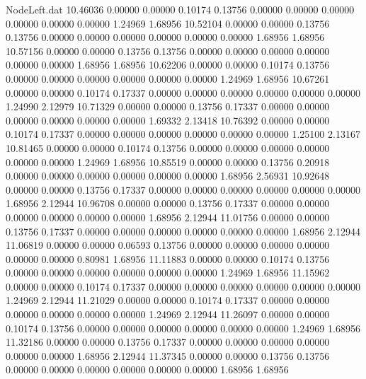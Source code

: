 \begin{filecontents}{NodeLeft.dat}
  10.46036    0.00000    0.00000     0.10174    0.13756    0.00000    0.00000    0.00000    0.00000    0.00000    0.00000    1.24969    1.68956
  10.52104    0.00000    0.00000     0.13756    0.13756    0.00000    0.00000    0.00000    0.00000    0.00000    0.00000    1.68956    1.68956
  10.57156    0.00000    0.00000     0.13756    0.13756    0.00000    0.00000    0.00000    0.00000    0.00000    0.00000    1.68956    1.68956
  10.62206    0.00000    0.00000     0.10174    0.13756    0.00000    0.00000    0.00000    0.00000    0.00000    0.00000    1.24969    1.68956
  10.67261    0.00000    0.00000     0.10174    0.17337    0.00000    0.00000    0.00000    0.00000    0.00000    0.00000    1.24990    2.12979
  10.71329    0.00000    0.00000     0.13756    0.17337    0.00000    0.00000    0.00000    0.00000    0.00000    0.00000    1.69332    2.13418
  10.76392    0.00000    0.00000     0.10174    0.17337    0.00000    0.00000    0.00000    0.00000    0.00000    0.00000    1.25100    2.13167
  10.81465    0.00000    0.00000     0.10174    0.13756    0.00000    0.00000    0.00000    0.00000    0.00000    0.00000    1.24969    1.68956
  10.85519    0.00000    0.00000     0.13756    0.20918    0.00000    0.00000    0.00000    0.00000    0.00000    0.00000    1.68956    2.56931
  10.92648    0.00000    0.00000     0.13756    0.17337    0.00000    0.00000    0.00000    0.00000    0.00000    0.00000    1.68956    2.12944
  10.96708    0.00000    0.00000     0.13756    0.17337    0.00000    0.00000    0.00000    0.00000    0.00000    0.00000    1.68956    2.12944
  11.01756    0.00000    0.00000     0.13756    0.17337    0.00000    0.00000    0.00000    0.00000    0.00000    0.00000    1.68956    2.12944
  11.06819    0.00000    0.00000     0.06593    0.13756    0.00000    0.00000    0.00000    0.00000    0.00000    0.00000    0.80981    1.68956
  11.11883    0.00000    0.00000     0.10174    0.13756    0.00000    0.00000    0.00000    0.00000    0.00000    0.00000    1.24969    1.68956
  11.15962    0.00000    0.00000     0.10174    0.17337    0.00000    0.00000    0.00000    0.00000    0.00000    0.00000    1.24969    2.12944
  11.21029    0.00000    0.00000     0.10174    0.17337    0.00000    0.00000    0.00000    0.00000    0.00000    0.00000    1.24969    2.12944
  11.26097    0.00000    0.00000     0.10174    0.13756    0.00000    0.00000    0.00000    0.00000    0.00000    0.00000    1.24969    1.68956
  11.32186    0.00000    0.00000     0.13756    0.17337    0.00000    0.00000    0.00000    0.00000    0.00000    0.00000    1.68956    2.12944
  11.37345    0.00000    0.00000     0.13756    0.13756    0.00000    0.00000    0.00000    0.00000    0.00000    0.00000    1.68956    1.68956

\end{filecontents}
